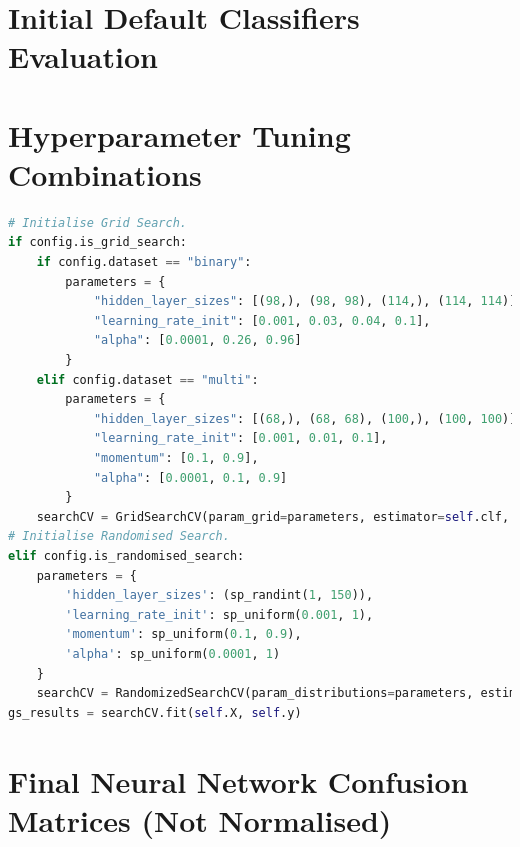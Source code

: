 \documentclass[letterpaper,12pt]{article}
\begin{document}
\begin{appendices}

\clearpage





\clearpage
\section{Initial Default Classifiers Evaluation}
\label{sec:appendix-initial-default-classifiers}





\clearpage
\section{Hyperparameter Tuning Combinations}
\label{sec:appendix-randomised-grid-search}

\begin{lstlisting}[language=Python]
# Initialise Grid Search.
if config.is_grid_search:
    if config.dataset == "binary":
        parameters = {
            "hidden_layer_sizes": [(98,), (98, 98), (114,), (114, 114)],
            "learning_rate_init": [0.001, 0.03, 0.04, 0.1],
            "alpha": [0.0001, 0.26, 0.96]
        }
    elif config.dataset == "multi":
        parameters = {
            "hidden_layer_sizes": [(68,), (68, 68), (100,), (100, 100)],
            "learning_rate_init": [0.001, 0.01, 0.1],
            "momentum": [0.1, 0.9],
            "alpha": [0.0001, 0.1, 0.9]
        }
    searchCV = GridSearchCV(param_grid=parameters, estimator=self.clf, cv=self.folds, scoring=scoring)
# Initialise Randomised Search.
elif config.is_randomised_search:
    parameters = {
        'hidden_layer_sizes': (sp_randint(1, 150)),
        'learning_rate_init': sp_uniform(0.001, 1),
        'momentum': sp_uniform(0.1, 0.9),
        'alpha': sp_uniform(0.0001, 1)
    }
    searchCV = RandomizedSearchCV(param_distributions=parameters, estimator=self.clf, n_iter=100, cv=self.folds, scoring=scoring)
gs_results = searchCV.fit(self.X, self.y)
\end{lstlisting}


\clearpage
\section{Final Neural Network Confusion Matrices (Not Normalised)}
\label{sec:appendix-cm-not-normalised}


\end{appendices}
\end{document}
